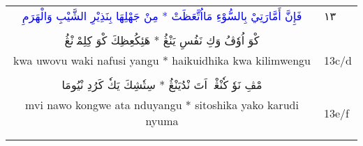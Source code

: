 \documentclass[a4paper, 10pt]{report}
\begin{document}
\begin{longtable}{cl}
\textcolor{blue}{\textarabic{فَإِنَّ أَمَّارَتِيْ بِالسُّوْءِ مَااُتَّعَظَتْ * مِنْ جَهْلِهَا بِنَذِيْرِ الشَّيْبِ وَالْهَرَمِ}} & \textarabic{١٣} \\* 
\E{ } & \\[2mm] 
\textcolor{mygreen}{\textarabic{كْوَ اُوٗڤُ وَكِ نَفُسِ يَنْڠُ * هَئِكُعِظِكَ كْوَ كِلِمْوٖنْڠُ}} &  \\* 
kwa uwovu waki nafusi yangu * haikuidhika kwa kilimwengu & 13c/d \\* 
\E{ } & \\[2mm] 
\textcolor{mygreen}{\textarabic{مْڤِ نَوٗ كٗنْڠْوٖ اَتَ نْدُيَنْڠُ * سِتٗشِكَ يَكٗ كَرُدِ نْيُومَا}} &  \\* 
mvi nawo kongwe ata nduyangu * sitoshika yako karudi nyuma & 13e/f \\* 
\E{ } & \\[2mm] 
\\[6mm] 

\end{longtable} 

\renewcommand{\bibname}{References} 
\begingroup 
\printbibliography 
\endgroup 
\end{document}
